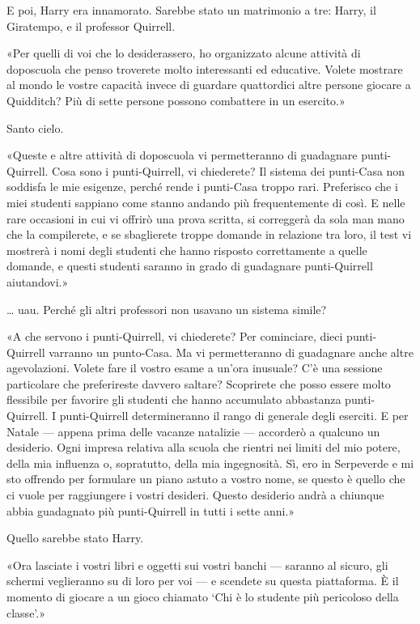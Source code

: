 E poi, Harry era innamorato. Sarebbe stato un matrimonio a tre: Harry, il Giratempo, e il professor Quirrell.

«Per quelli di voi che lo desiderassero, ho organizzato alcune attività di doposcuola che penso troverete molto interessanti ed educative. Volete mostrare al mondo le vostre capacità invece di guardare quattordici altre persone giocare a Quidditch? Più di sette persone possono combattere in un esercito.»

Santo cielo.

«Queste e altre attività di doposcuola vi permetteranno di guadagnare punti-Quirrell. Cosa sono i punti-Quirrell, vi chiederete? Il sistema dei punti-Casa non soddisfa le mie esigenze, perché rende i punti-Casa troppo rari. Preferisco che i miei studenti sappiano come stanno andando più frequentemente di così. E nelle rare occasioni in cui vi offrirò una prova scritta, si correggerà da sola man mano che la compilerete, e se sbaglierete troppe domande in relazione tra loro, il test vi mostrerà i nomi degli studenti che hanno risposto correttamente a quelle domande, e questi studenti saranno in grado di guadagnare punti-Quirrell aiutandovi.»

… uau. Perché gli altri professori non usavano un sistema simile?

«A che servono i punti-Quirrell, vi chiederete? Per cominciare, dieci punti-Quirrell varranno un punto-Casa. Ma vi permetteranno di guadagnare anche altre agevolazioni. Volete fare il vostro esame a un’ora inusuale? C’è una sessione particolare che preferireste davvero saltare? Scoprirete che posso essere molto flessibile per favorire gli studenti che hanno accumulato abbastanza punti-Quirrell. I punti-Quirrell determineranno il rango di generale degli eserciti. E per Natale — appena prima delle vacanze natalizie — accorderò a qualcuno un desiderio. Ogni impresa relativa alla scuola che rientri nei limiti del mio potere, della mia influenza o, sopratutto, della mia ingegnosità. Sì, ero in Serpeverde e mi sto offrendo per formulare un piano astuto a vostro nome, se questo è quello che ci vuole per raggiungere i vostri desideri. Questo desiderio andrà a chiunque abbia guadagnato più punti-Quirrell in tutti i sette anni.»

Quello sarebbe stato Harry.

«Ora lasciate i vostri libri e oggetti sui vostri banchi — saranno al sicuro, gli schermi veglieranno su di loro per voi — e scendete su questa piattaforma. È il momento di giocare a un gioco chiamato ‘Chi è lo studente più pericoloso della classe’.»

